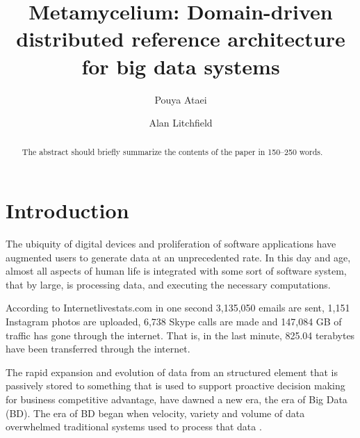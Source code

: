 \documentclass[runningheads]{llncs}
\begin{document}
%
\title{Metamycelium: Domain-driven distributed reference architecture for big data systems}
%
%
\author{Pouya Ataei \and
Alan Litchfield}
%
%
%
\maketitle              %
%
\begin{abstract}
The abstract should briefly summarize the contents of the paper in
150--250 words.

\end{abstract}
%
%
%
\section{Introduction}
The ubiquity of digital devices and proliferation of software applications have augmented users to generate data at an unprecedented rate. In this day and age, almost all aspects of human life is integrated with some sort of software system, that by large, is processing data, and executing the necessary computations. 

According to Internetlivestats.com \cite{internet2019internet} in one second 3,135,050 emails are sent, 1,151 Instagram photos are uploaded, 6,738 Skype calls are made and 147,084 GB of traffic has gone through the internet. That is, in the last minute, 825.04 terabytes have been transferred through the internet. 

The rapid expansion and evolution of data from an structured element that is passively stored to something that is used to support proactive decision making for business competitive advantage, have dawned a new era, the era of Big Data (BD). The era of BD began when velocity, variety and volume of data overwhelmed traditional systems used to process that data \cite{ataei2021neomycelia}\cite{AtaeiACIS}. 
\end{document}
